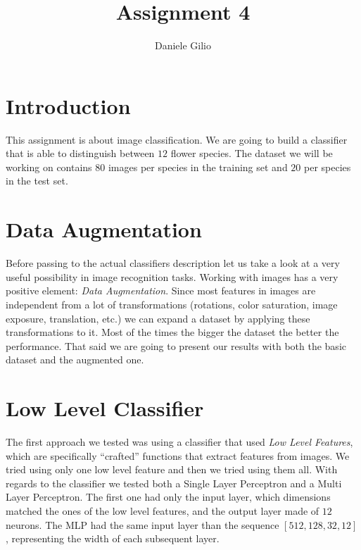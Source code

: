 \documentclass[10pt,a4paper]{report}
\author{Daniele Gilio}
\title{Assignment 4}
\begin{document}
\maketitle
\section{Introduction}
This assignment is about image classification. We are going to build a classifier that is able to distinguish between $12$ flower species. The dataset we will be working on contains $80$ images per species in the training set and $20$ per species in the test set.
\section{Data Augmentation}
Before passing to the actual classifiers description let us take a look at a very useful possibility in image recognition tasks. Working with images has a very positive element: \textit{Data Augmentation}. Since most features in images are independent from a lot of transformations (rotations, color saturation, image exposure, translation, etc.) we can expand a dataset by applying these transformations to it. Most of the times the bigger the dataset the better the performance. That said we are going to present our results with both the basic dataset and the augmented one.
\section{Low Level Classifier}
The first approach we tested was using a classifier that used \textit{Low Level Features}, which are specifically \enquote{crafted} functions that extract features from images. We tried using only one low level feature and then we tried using them all. With regards to the classifier we tested both a Single Layer Perceptron and a Multi Layer Perceptron. The first one had only the input layer, which dimensions matched the ones of the low level features, and the output layer made of $12$ neurons. The MLP had the same input layer than the sequence $[512, 128, 32, 12]$, representing the width of each subsequent layer.
\end{document}
